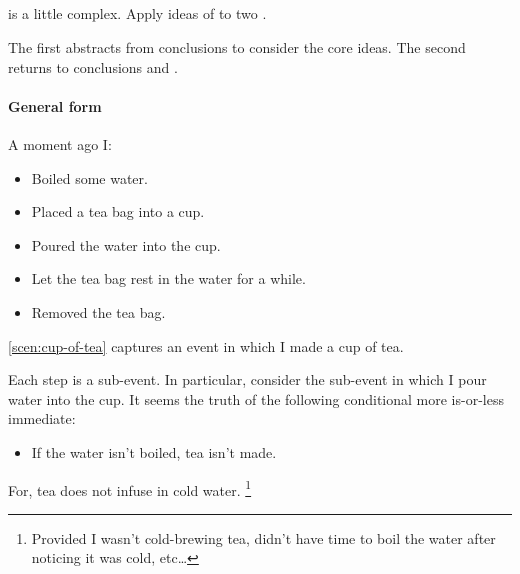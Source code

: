 \subsection*{}

\begin{note}
  \qWhyV{} is a little complex.
  Apply ideas of \qWhyV{} to two .

  The first  abstracts from conclusions to consider the core ideas.
  The second  returns to conclusions and .
\end{note}

\paragraph*{General form}

\begin{note}
  \begin{scenario}%
    \label{scen:cup-of-tea}%
    A moment ago I:
    \begin{itemize}[noitemsep]
    \item
      Boiled some water.
    \item
      Placed a tea bag into a cup.
    \item
      Poured the water into the cup.
    \item
      Let the tea bag rest in the water for a while.
    \item
      Removed the tea bag.
    \end{itemize}
    \vspace{-\baselineskip}
  \end{scenario}

  \autoref{scen:cup-of-tea} captures an event in which I made a cup of tea.

  Each step is a sub-event.
  In particular, consider the sub-event in which I pour water into the cup.
  It seems the truth of the following conditional more is-or-less immediate:
  \begin{itemize}
  \item
    If the water isn't boiled, tea isn't made.
  \end{itemize}
  For, tea does not infuse in cold water.%
  \footnote{
    Provided I wasn't cold-brewing tea, didn't have time to boil the water after noticing it was cold, etc\dots
  }
\end{note}

